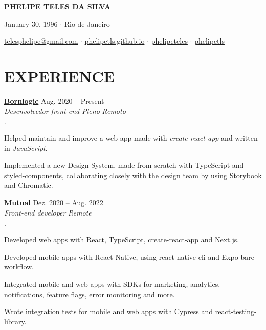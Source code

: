 \documentclass[12pt]{article}
\newenvironment{tightlist}
  {\begin{list}
    {$\cdot$}
    {
      \setlength{\leftmargin}{0em}
      \setlength{\itemsep}{\smallskipamount}
    }
  }
{\end{list}}
\begin{document}
\pagestyle{empty}

\centerline{\huge\bf PHELIPE TELES DA SILVA}
\medskip

\centerline{January 30, 1996 $\cdot$ Rio de Janeiro}
\smallskip

\centerline{
  \href{mailto:telesphelipe@gmail.com}{ telesphelipe@gmail.com}
  $\cdot$
  \href{https://phelipetls.github.io}{ phelipetls.github.io}
  $\cdot$
  \href{https://linkedin.com/in/phelipeteles}{ phelipeteles}
  $\cdot$
  \href{https://github.com/phelipetls/}{ phelipetls}
}
\smallskip

\section*{EXPERIENCE}

\textbf{\href{https://www.bornlogic.com}{Bornlogic}} \hfill Aug. 2020 -- Present \\
\textit{Desenvolvedor front-end Pleno} \hfill \textit{Remoto} {\parfillskip=0pt\par}

\begin{tightlist}
  \item Helped maintain and improve a web app made with \emph{create-react-app}
    and written in \emph{JavaScript}.
  \item Implemented a new Design System, made from scratch with TypeScript and
    styled-components, collaborating closely with the design team by using
    Storybook and Chromatic.
\end{tightlist}

\textbf{\href{https://mutual.club}{Mutual}} \hfill Dez. 2020 -- Aug. 2022 \\
\textit{Front-end developer} \hfill \textit{Remote} {\parfillskip=0pt\par}

\begin{tightlist}
  \item Developed web apps with React, TypeScript, create-react-app and Next.js.
  \item Developed mobile apps with React Native, using react-native-cli and Expo
    bare workflow.
  \item Integrated mobile and web apps with SDKs for marketing, analytics,
    notifications, feature flags, error monitoring and more.
  \item Wrote integration tests for mobile and web apps with Cypress and
    react-testing-library.
\end{tightlist}
\end{document}

